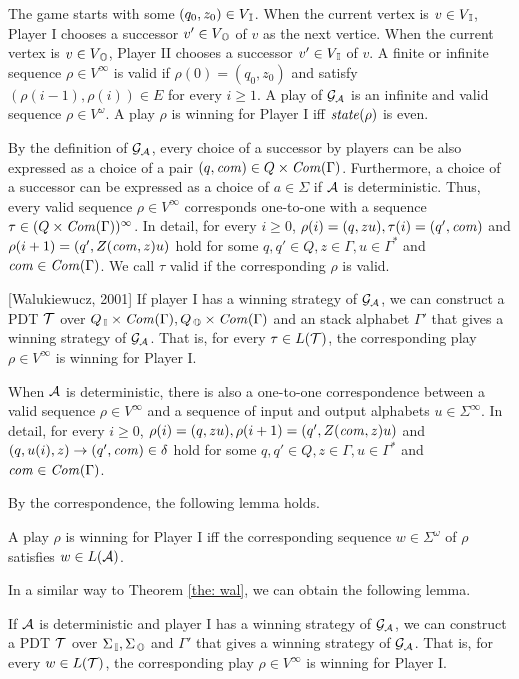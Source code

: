 The game starts with some $(q_0,z_0)\in V_{\, \mathbb{I}}$.
When the current vertex is $v\in V_{\, \mathbb{I}}$,
Player I chooses a successor $v'\in V_{\, \mathbb{O}}$ of $v$ as the next vertice.
When the current vertex is $v\in V_{\, \mathbb{O}}$,
Player II chooses a successor $v'\in V_{\, \mathbb{I}}$ of $v$.
A finite or infinite sequence $\rho\in V^\infty$ is valid if
$\rho(0)=(q_0,z_0)$ and satisfy
$(\rho(i-1), \rho(i))\in E$ for every $i\geq 1$.
A play of ${\cal G}_{\cal A}$ is an infinite and valid sequence $\rho\in V^\omega$.
A play $\rho$ is winning for Player I iff $\mathit{state}(\rho)$ is even.

By the definition of ${\cal G}_{\cal A}$,
every choice of a successor by players can be also expressed as
a choice of a pair $(q,\mathit{com})\in Q\times \mathit{Com}(\Gamma)$. Furthermore, a choice of a successor can be expressed as a choice of $a\in\Sigma$ if ${\cal A}$ is deterministic.
Thus, every valid sequence $\rho \in V^\infty$
corresponds one-to-one with a sequence $\tau\in (Q\times \mathit{Com}(\Gamma))^\infty$.
In detail, for every $i\geq 0$, $\rho(i) = (q, zu), \tau(i) = (q', \mathit{com})$ and $\rho(i+1) = (q', Z(\mathit{com},z)u)$ hold for some $q, q'\in Q, z\in\Gamma, u\in\Gamma^*$ and $\mathit{com}\in \mathit{Com}(\Gamma)$.
We call $\tau$ valid if the corresponding $\rho$ is valid.

\begin{theorem}{[Walukiewucz, 2001]}
\label{the: wal}
If player I has a winning strategy of ${\cal G}_{\cal A}$,
we can construct a PDT ${\cal T}$ over $Q_{\, \mathbb{I}}\times\mathit{Com}(\Gamma), Q_{\, \mathbb{O}}\times\mathit{Com}(\Gamma)$ and an stack alphabet $\Gamma'$ that gives a winning strategy of ${\cal G}_{\cal A}$.
That is, for every $\tau\in L({\cal T})$, the corresponding play $\rho\in V^\infty$ is winning for Player I.
\end{theorem}

When ${\cal A}$ is deterministic,
there is also a one-to-one correspondence between
a valid sequence $\rho\in V^\infty$ and a sequence of input and output alphabets $u\in\Sigma^\infty$.
In detail, for every $i\geq 0$, $\rho(i) = (q, zu), \rho(i+1) = (q', Z(\mathit{com},z)u)$ and $(q, u(i), z) \to (q', \mathit{com})\in\delta$ hold for some $q, q'\in Q, z\in\Gamma, u\in\Gamma^*$ and $\mathit{com}\in \mathit{Com}(\Gamma)$.

By the correspondence, the following lemma holds.
\begin{lemma}
\label{lem: 1}
A play $\rho$ is winning for Player I iff
the corresponding sequence $w\in \Sigma^\omega$ of $\rho$
satisfies $w\in L({\cal A})$.
\end{lemma}

In a similar way to Theorem \ref{the: wal},
we can obtain the following lemma.
\begin{lemma}
\label{lem: 2}
If ${\cal A}$ is deterministic and player I has a winning strategy of ${\cal G}_{\cal A}$,
we can construct a PDT ${\cal T}$ over $\Sigma_{\, \mathbb{I}}, \Sigma_{\, \mathbb{O}}$ and $\Gamma'$ that gives a winning strategy of ${\cal G}_{\cal A}$.
That is, for every $w\in L({\cal T})$, the corresponding play $\rho\in V^\infty$ is winning for Player I.
\end{lemma}
